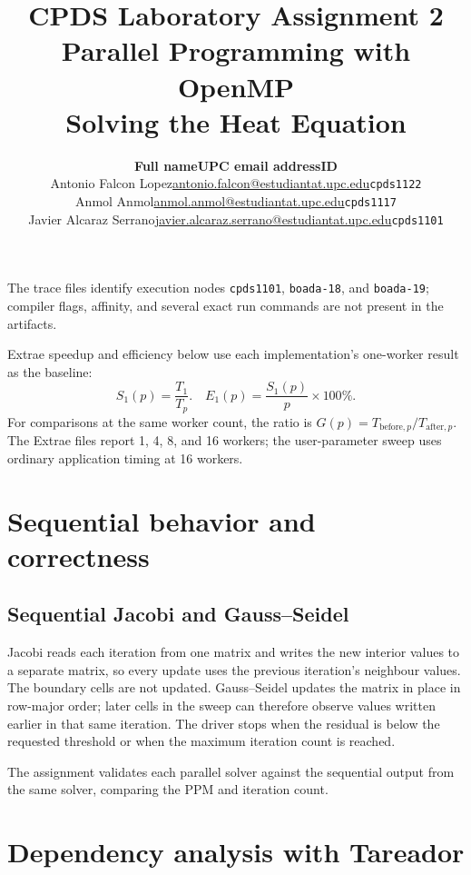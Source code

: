 \documentclass[11pt,a4paper]{article}
\title{
  \textbf{CPDS Laboratory Assignment 2}\\[0.4em]
  Parallel Programming with OpenMP\\
  \large Solving the Heat Equation
}
\author{
  \small
  \begin{tabular}{p{3.5cm}p{8.5cm}p{1.5cm}}
    \textbf{Full name} & \textbf{UPC email address} & \textbf{ID} \\
    Antonio Falcon Lopez &
    \url{antonio.falcon@estudiantat.upc.edu} &
    \texttt{cpds1122} \\
    Anmol Anmol &
    \url{anmol.anmol@estudiantat.upc.edu} &
    \texttt{cpds1117} \\
    Javier Alcaraz Serrano &
    \url{javier.alcaraz.serrano@estudiantat.upc.edu} &
    \texttt{cpds1101}
  \end{tabular}
}
\date{}
\begin{document}
\maketitle

\tableofcontents
\newpage

The trace files identify execution nodes \texttt{cpds1101},
\texttt{boada-18}, and \texttt{boada-19}; compiler flags, affinity, and
several exact run commands are not present in the artifacts.

Extrae speedup and efficiency below use each implementation's
one-worker result as the baseline:
\[
  S_1(p)=\frac{T_1}{T_p}.
  \quad
  E_1(p)=\frac{S_1(p)}{p}\times 100\%.
\]
For comparisons at the same worker count, the ratio is
$G(p)=T_{\mathrm{before},p}/T_{\mathrm{after},p}$. The Extrae files
report 1, 4, 8, and 16 workers; the user-parameter sweep uses ordinary
application timing at 16 workers.

\section{Sequential behavior and correctness}

\subsection{Sequential Jacobi and Gauss--Seidel}

Jacobi reads each iteration from one matrix and writes the new interior
values to a separate matrix, so every update uses the previous iteration's
neighbour values. The boundary cells are not updated. Gauss--Seidel
updates the matrix in place in row-major order; later cells in the sweep
can therefore observe values written earlier in that same iteration.
The driver stops when the residual is below the requested threshold or
when the maximum iteration count is reached.

The assignment validates each parallel solver against the sequential
output from the same solver, comparing the PPM and iteration count.

\FloatBarrier

\section{Dependency analysis with Tareador}
\end{document}
